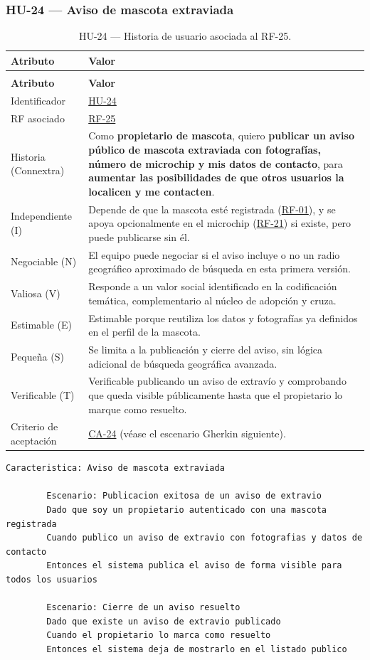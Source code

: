 \documentclass[journal,onecolumn]{IEEEtran}
\makeatletter
\newenvironment{atributos}[2]{%
	\small
	\begin{longtable}{@{}>{\raggedright\arraybackslash}p{4.2cm} >{\raggedright\arraybackslash}p{11.2cm}@{}}
		\caption{#2}\label{tab:#1}\\
		\toprule
		\textbf{Atributo} & \textbf{Valor} \\
		\midrule
		\endfirsthead
		\multicolumn{2}{@{}l}{\small\itshape (continuación)}\\
		\toprule
		\textbf{Atributo} & \textbf{Valor} \\
		\midrule
		\endhead
		\bottomrule
		\endlastfoot
	}{%
	\end{longtable}
	\normalsize
}
\makeatother
\begin{document}
	\subsubsection{HU-24 --- Aviso de mascota extraviada}
	
	\begin{atributos}{HU-24}{HU-24 --- Historia de usuario asociada al RF-25.}
		Identificador & \hyperref[tab:HU-24]{HU-24} \\
		RF asociado & \hyperref[tab:RF-25]{RF-25} \\
		Historia (Connextra) & Como \textbf{propietario de mascota}, quiero \textbf{publicar un aviso público de mascota extraviada con fotografías, número de microchip y mis datos de contacto}, para \textbf{aumentar las posibilidades de que otros usuarios la localicen y me contacten}. \\
		Independiente (I) & Depende de que la mascota esté registrada (\hyperref[tab:RF-01]{RF-01}), y se apoya opcionalmente en el microchip (\hyperref[tab:RF-21]{RF-21}) si existe, pero puede publicarse sin él. \\
		Negociable (N) & El equipo puede negociar si el aviso incluye o no un radio geográfico aproximado de búsqueda en esta primera versión. \\
		Valiosa (V) & Responde a un valor social identificado en la codificación temática, complementario al núcleo de adopción y cruza. \\
		Estimable (E) & Estimable porque reutiliza los datos y fotografías ya definidos en el perfil de la mascota. \\
		Pequeña (S) & Se limita a la publicación y cierre del aviso, sin lógica adicional de búsqueda geográfica avanzada. \\
		Verificable (T) & Verificable publicando un aviso de extravío y comprobando que queda visible públicamente hasta que el propietario lo marque como resuelto. \\
		Criterio de aceptación & \hyperref[lst:ca24]{CA-24} (véase el escenario Gherkin siguiente). \\
	\end{atributos}
	
	\begin{lstlisting}[style=gherkin,caption={CA-24 --- Escenario de aceptación de la historia HU-24.},label={lst:ca24}]
		Caracteristica: Aviso de mascota extraviada
		
		Escenario: Publicacion exitosa de un aviso de extravio
		Dado que soy un propietario autenticado con una mascota registrada
		Cuando publico un aviso de extravio con fotografias y datos de contacto
		Entonces el sistema publica el aviso de forma visible para todos los usuarios
		
		Escenario: Cierre de un aviso resuelto
		Dado que existe un aviso de extravio publicado
		Cuando el propietario lo marca como resuelto
		Entonces el sistema deja de mostrarlo en el listado publico
	\end{lstlisting}
	
\end{document}
